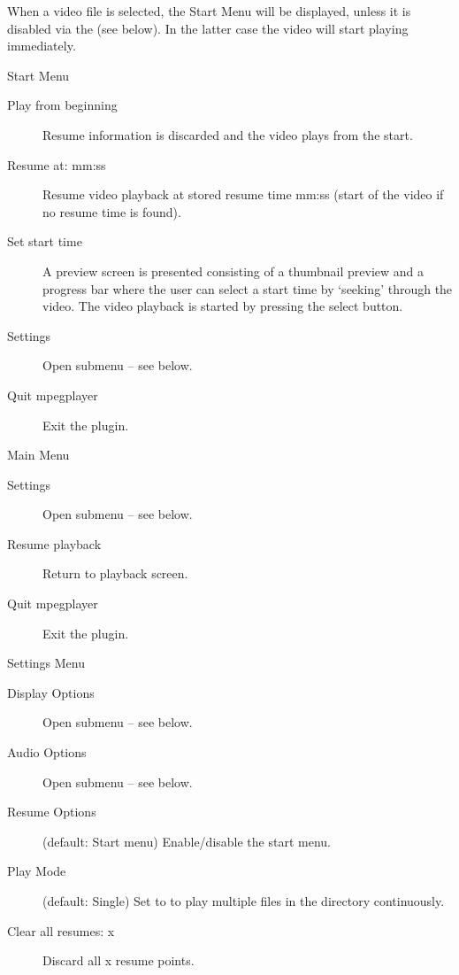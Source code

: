 
When a video file is selected, the Start Menu will be displayed, unless it is 
disabled via the  (see below). In the latter case the video 
will start playing immediately.

Start Menu

\begin{description}
\item[Play from beginning] Resume information is discarded and the video plays
    from the start.
\item[Resume at: mm:ss] Resume video playback at stored resume time mm:ss
    (start of the video if no resume time is found).
\item[Set start time] A preview screen is presented consisting of a
    thumbnail preview and a progress bar where the user can select a start time
    by `seeking' through the video. The video playback is started by pressing
    the select button.
\item[Settings] Open  submenu -- see below.
\item[Quit mpegplayer] Exit the plugin.
\end{description}

Main Menu

\begin{description}
\item[Settings] Open  submenu -- see below.
\item[Resume playback] Return to playback screen.
\item[Quit mpegplayer] Exit the plugin.
\end{description}

Settings Menu

\begin{description}
\item[Display Options] Open  submenu -- see below.
\item[Audio Options] Open  submenu -- see below.
\item[Resume Options] (default: Start menu) Enable/disable the start menu.
\item[Play Mode] (default: Single) Set to  to play multiple
     files in the directory continuously.
\item[Clear all resumes: x] Discard all x resume points.
\end{description}

